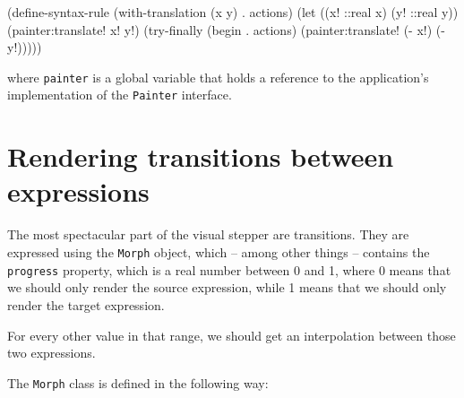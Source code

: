\documentclass[acmsmall]{acmart}
\newenvironment{Snippet}{\Verbatim[samepage=true]}{\endVerbatim}
\begin{document}
\begin{Snippet}
(define-syntax-rule (with-translation (x y)
		      . actions)
  (let ((x! ::real x)
        (y! ::real y))
    (painter:translate! x! y!)
    (try-finally
     (begin . actions)
     (painter:translate! (- x!) (- y!)))))
\end{Snippet}

where \texttt{painter} is a global variable that holds a reference
to the application's implementation of the \texttt{Painter} interface.


\section{Rendering transitions between expressions}

The most spectacular part of the visual stepper are transitions. They
are expressed using the \texttt{Morph} object, which -- among other
things -- contains the \texttt{progress} property, which is a real
number between 0 and 1, where 0 means that we should only render the
source expression, while 1 means that we should only render the target
expression.

For every other value in that range, we should get an interpolation
between those two expressions.

The \texttt{Morph} class is defined in the following way:
\end{document}
